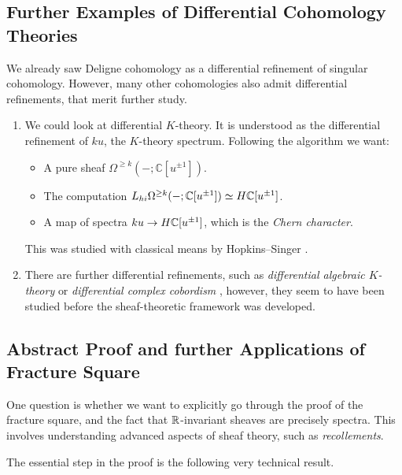 \documentclass[10pt]{amsart}
\begin{document}
\subsection{Further Examples of Differential Cohomology Theories}
We already saw Deligne cohomology as a differential refinement of singular cohomology. However, many other cohomologies also admit differential refinements, that merit further study.
\begin{enumerate}
  \item We could look at differential $K$-theory. It is understood as the differential refinement of $ku$, the $K$-theory spectrum. Following the algorithm we want:
  \begin{itemize}
   \item A pure sheaf $\Omega^{\geq k}(- ;\mathbb{C}[u^{\pm 1}])$.
   \item The computation $L_{hi}\Omega^{\geq k}(- ;\mathbb{C}[u^{\pm 1}]) \simeq H\mathbb{C}[u^{\pm 1}]$.
   \item A map of spectra $ku \to H\mathbb{C}[u^{\pm 1}]$, which is the \emph{Chern character}.
  \end{itemize}
  This was studied with classical means by Hopkins--Singer \cite{hopkinssinger2005diffcoh}.
  \item There are further differential refinements, such as \emph{differential algebraic $K$-theory} \cite{bunkegepner2021diffktheory} or \emph{differential complex cobordism} \cite{bunkeschickschroederwiethaup2009landweber}, however, they seem to have been studied before the sheaf-theoretic framework was developed.
\end{enumerate}

\subsection{Abstract Proof and further Applications of Fracture Square}
One question is whether we want to explicitly go through the proof of the fracture square, and the fact that $\mathbb{R}$-invariant sheaves are precisely spectra. This involves understanding advanced aspects of sheaf theory, such as \emph{recollements}.

The essential step in the proof is the following very technical result.
\end{document}
